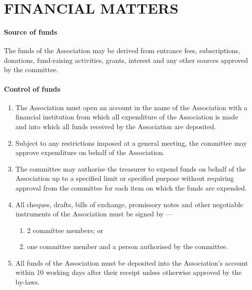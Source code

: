 \documentclass[../constitution.tex]{subfiles}
\begin{document}
\hypertarget{part-7-financial-matters}{%
\part{FINANCIAL MATTERS}\label{part-7-financial-matters}}

\hypertarget{source-of-funds}{%
\subsection{Source of funds}\label{source-of-funds}}

The funds of the Association may be derived from entrance fees, subscriptions,  donations, fund-raising activities, grants, interest and any other sources approved by the committee.

\hypertarget{control-of-funds}{%
\subsection{Control of funds}\label{control-of-funds}}

\begin{enumerate}

\item The Association must open an account in the name of the Association with a financial institution from which all expenditure of the Association is made and into which all funds received by the Association are deposited.
\item Subject to any restrictions imposed at a general meeting, the committee may approve expenditure on behalf of the Association.
\item The committee may authorise the treasurer to expend funds on behalf of the Association up to a specified limit or specified purpose without requiring approval from the committee for each item on which the funds are expended.
\item All cheques, drafts, bills of exchange, promissory notes and other negotiable instruments of the Association must be signed by ---

  \begin{enumerate}
  
  \item 2 committee members; or
  \item one committee member and a person authorised by the committee.
  \end{enumerate}
\item All funds of the Association must be deposited into the Association's account within 10 working days after their receipt unless otherwise approved by the by-laws. 
\end{enumerate}
\end{document}
